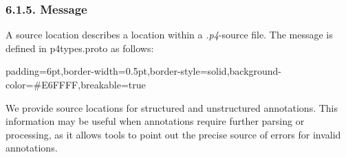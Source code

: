\documentclass[11pt]{article}
\begin{document}
{%
\subsubsection{6.1.5.\hspace*{0.5em} Message}\label{sec-sourcelocation-message}%

\noindent{}A source location describes a location within a \emph{.p4}-source file. The
 message is defined in p4types.proto as follows:%

\begin{mdbmargintb}{6pt}{6pt}%
\begin{mdblock}{padding=6pt,border-width=0.5pt,border-style=solid,background-color=\#E6FFFF,breakable=true}%
\begin{mdpre}%
\end{mdpre}%
\end{mdblock}%
\end{mdbmargintb}%

\noindent{}We provide source locations for structured and unstructured annotations. This
information may be useful when annotations require further parsing or
processing, as it allows tools to point out the precise source of errors for
invalid annotations.%

}
\end{document}

